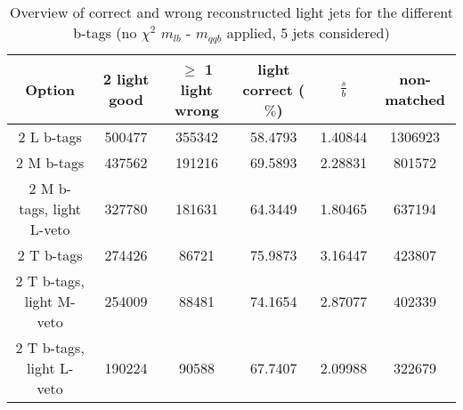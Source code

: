\begin{table}[!h] 
 \begin{tabular}{c|c|c|c|c|c} 
  \textbf{Option} & 2 light good  & $\geq$ 1 light wrong & light correct ($\%$) & $\frac{s}{b}$ & non-matched \\ \hline 
  2 L b-tags              & 500477 & 355342 & 58.4793 & 1.40844 & 1306923\\ 
  2 M b-tags              & 437562 & 191216 & 69.5893 & 2.28831 & 801572\\ 
  2 M b-tags, light L-veto & 327780 & 181631 & 64.3449 & 1.80465 & 637194\\ 
  2 T b-tags              & 274426 & 86721 & 75.9873 & 3.16447 & 423807\\ 
  2 T b-tags, light M-veto & 254009 & 88481 & 74.1654 & 2.87077 & 402339\\ 
  2 T b-tags, light L-veto & 190224 & 90588 & 67.7407 & 2.09988 & 322679\\ 
 \end{tabular} 
 \caption{Overview of correct and wrong reconstructed light jets for the different b-tags (no $\chi^{2}$ $m_{lb}$ - $m_{qqb}$ applied, 5 jets considered)}
\end{table} 
 
